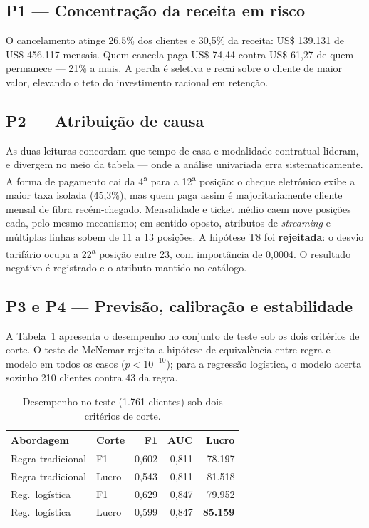 \documentclass[10pt,a4paper]{article}
\begin{document}
\subsection{P1 --- Concentração da receita em risco}

O cancelamento atinge 26,5\% dos clientes e 30,5\% da receita: US\$ 139.131 de US\$ 456.117
mensais. Quem cancela paga US\$ 74,44 contra US\$ 61,27 de quem permanece --- 21\% a mais. A
perda é seletiva e recai sobre o cliente de maior valor, elevando o teto do investimento
racional em retenção.

\subsection{P2 --- Atribuição de causa}

As duas leituras concordam que tempo de casa e modalidade contratual lideram, e divergem no
meio da tabela --- onde a análise univariada erra sistematicamente. A forma de pagamento cai da
4\textsuperscript{a} para a 12\textsuperscript{a} posição: o cheque eletrônico exibe a maior
taxa isolada (45,3\%), mas quem paga assim é majoritariamente cliente mensal de fibra
recém-chegado. Mensalidade e ticket médio caem nove posições cada, pelo mesmo mecanismo; em
sentido oposto, atributos de \emph{streaming} e múltiplas linhas sobem de 11 a 13 posições.
A hipótese T8 foi \textbf{rejeitada}: o desvio tarifário ocupa a 22\textsuperscript{a} posição
entre 23, com importância de 0,0004. O resultado negativo é registrado e o atributo mantido no
catálogo.

\subsection{P3 e P4 --- Previsão, calibração e estabilidade}

A Tabela~\ref{tab:predicao} apresenta o desempenho no conjunto de teste sob os dois
critérios de corte. O teste de McNemar rejeita a hipótese de equivalência entre regra e
modelo em todos os casos (\(p < 10^{-10}\)); para a regressão logística, o modelo acerta
sozinho 210 clientes contra 43 da regra.

\begin{table}[t]
\centering
\small
\caption{Desempenho no teste (1.761 clientes) sob dois critérios de corte.}
\label{tab:predicao}
\begin{tabular}{@{}llrrr@{}}
\toprule
\textbf{Abordagem} & \textbf{Corte} & \textbf{F1} & \textbf{AUC} & \textbf{Lucro} \\
\midrule
Regra tradicional & F1    & 0,602 & 0,811 & 78.197 \\
Regra tradicional & Lucro & 0,543 & 0,811 & 81.518 \\
Reg.\ logística   & F1    & 0,629 & 0,847 & 79.952 \\
Reg.\ logística   & Lucro & 0,599 & 0,847 & \textbf{85.159} \\
\bottomrule
\end{tabular}
\end{table}
\end{document}
